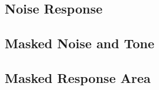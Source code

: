  \subsection{Noise Response}


 \subsection{Masked Noise and Tone}

 \subsection{Masked Response Area}

